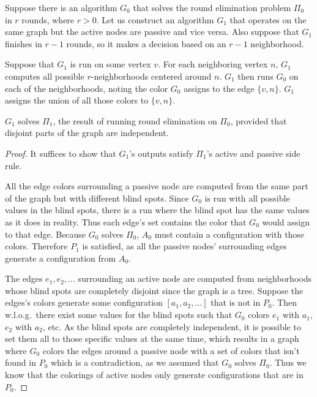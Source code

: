 \documentclass[english, 12pt, a4paper, sci, a-1b, online]{aaltothesis}
\begin{document}
Suppose there is an algorithm $G_0$ that solves the round elimination problem $\Pi_0$ in $r$ rounds, where $r > 0$. Let us construct an algorithm $G_1$ that operates on the same graph but the active nodes are passive and vice versa. Also suppose that $G_1$ finishes in $r-1$ rounds, so it makes a decision based on an $r-1$ neighborhood.

Suppose that $G_1$ is run on some vertex $v$. For each neighboring vertex $n$, $G_1$ computes all possible $r$-neighborhoods centered around $n$. $G_1$ then runs $G_0$ on each of the neighborhoods, noting the color $G_0$ assigns to the edge $\{v, n\}$. $G_1$ assigns the union of all those colors to $\{v, n\}$.

\begin{lemma}
  $G_1$ solves $\Pi_1$, the result of running round elimination on $\Pi_0$, provided that disjoint parts of the graph are independent.
\end{lemma}
\begin{proof}
  It suffices to show that $G_1$'s outputs satisfy $\Pi_1$'s active and passive side rule.

  All the edge colors surrounding a passive node are computed from the same part of the graph but with different blind spots. Since $G_0$ is run  with all possible values in the blind spots, there is a run where the blind spot has the same values as it does in reality. Thus each edge's set contains the color that $G_0$ would assign to that edge. Because $G_0$ solves $\Pi_0$, $A_0$ must contain a configuration with those colors. Therefore $P_1$ is satisfied, as all the passive nodes' surrounding edges generate a configuration from $A_0$.

  The edges $e_1, e_2, \ldots$ surrounding an active node are computed from neighborhoods whose blind spots are completely disjoint since the graph is a tree. Suppose the edges's colors generate some configuration $[a_1, a_2, \ldots]$ that is not in $P_0$. Then w.l.o.g.\ there exist some values for the blind spots such that $G_0$ colors $e_1$ with $a_1$, $e_2$ with $a_2$, etc. As the blind spots are completely independent, it is possible to set them all to those specific values at the same time, which results in a graph where $G_0$ colors the edges around a passive node with a set of colors that isn't found in $P_0$ which is a contradiction, as we assumed that $G_0$ solves $\Pi_0$. Thus we know that the colorings of active nodes only generate configurations that are in $P_0$.
\end{proof}
\end{document}
